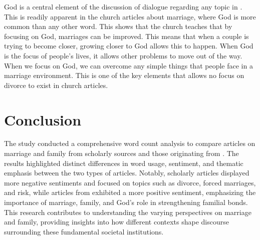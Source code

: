 \documentclass[twocolumn]{article}
\begin{document}
God is a central element of the discussion of dialogue regarding any topic in \church. This is readily apparent in the church articles about marriage, where God is more common than any other word. This shows that the church teaches that by focusing on God, marriages can be improved. This means that when a couple is trying to become closer, growing closer to God allows this to happen. When God is the focus of people's lives, it allows other problems to move out of the way. When we focus on God, we can overcome any simple things that people face in a marriage environment. This is one of the key elements that allows no focus on divorce to exist in church articles.

\section{Conclusion}

The study conducted a comprehensive word count analysis to compare articles on marriage and family from scholarly sources and those originating from \church. The results highlighted distinct differences in word usage, sentiment, and thematic emphasis between the two types of articles. Notably, scholarly articles displayed more negative sentiments and focused on topics such as divorce, forced marriages, and risk, while articles from \church  exhibited a more positive sentiment, emphasizing the importance of marriage, family, and God's role in strengthening familial bonds. This research contributes to understanding the varying perspectives on marriage and family, providing insights into how different contexts shape discourse surrounding these fundamental societal institutions.

% 
\end{document}
